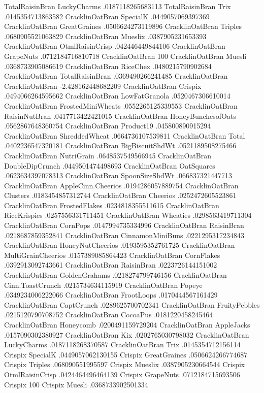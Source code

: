 TotalRaisinBran	LuckyCharms	.0187118265683113
TotalRaisinBran	Trix	.0145354713863582
CracklinOatBran	SpecialK	.0449057069397369
CracklinOatBran	GreatGraines	.0506624273119896
CracklinOatBran	Triples	.0680905521063829
CracklinOatBran	Mueslix	.0387905231653393
CracklinOatBran	OtmlRaisinCrisp	.042446449844106
CracklinOatBran	GrapeNuts	.0712184716810718
CracklinOatBran	100%
CracklinOatBran	Muesli	.0368733905086619
CracklinOatBran	RiceChex	.0480215790902684
CracklinOatBran	TotalRaisinBran	.0369490266241485
CracklinOatBran	CracklinOatBran	-2.428162448682209
CracklinOatBran	Crispix	.0494066264595662
CracklinOatBran	LowFatGranola	.0520467306610014
CracklinOatBran	FrostedMiniWheats	.0552265125339553
CracklinOatBran	RaisinNutBran	.0417713422421015
CracklinOatBran	HoneyBunchesofOats	.0562867648360754
CracklinOatBran	Product19	.045800890915294
CracklinOatBran	ShreddedWheat	.0664736107539811
CracklinOatBran	Total	.0402236547320181
CracklinOatBran	BigBiscuitShdWt	.0521189508275466
CracklinOatBran	NutriGrain	.0648537549566945
CracklinOatBran	DoubleDipCrunch	.0449501474498693
CracklinOatBran	OatSquares	.0623634397078313
CracklinOatBran	SpoonSizeShdWt	.066837321447713
CracklinOatBran	AppleCinn.Cheerios	.0194286057889754
CracklinOatBran	Clusters	.0183454857312744
CracklinOatBran	Cheerios	.0252472605523861
CracklinOatBran	FrostedFlakes	.0234818355511615
CracklinOatBran	RiceKrispies	.0257556331711451
CracklinOatBran	Wheaties	.0298563419711304
CracklinOatBran	CornPops	.0147994735334996
CracklinOatBran	RaisinBran	.0218687859352841
CracklinOatBran	CinnamonMiniBuns	.0221295317234843
CracklinOatBran	HoneyNutCheerios	.0193595352761725
CracklinOatBran	MultiGrainCheerios	.0157389085864423
CracklinOatBran	CornFlakes	.0392913092743661
CracklinOatBran	RaisinBran	.0223726144151002
CracklinOatBran	GoldenGrahams	.0218274799746156
CracklinOatBran	Cinn.ToastCrunch	.0215734634115919
CracklinOatBran	Popeye	.0349234006222066
CracklinOatBran	FrootLoops	.0170444567161429
CracklinOatBran	CaptCrunch	.0289625700702341
CracklinOatBran	FruityPebbles	.0215120790708752
CracklinOatBran	CocoaPus	.0181220458245464
CracklinOatBran	Honeycomb	.0200491159729204
CracklinOatBran	AppleJacks	.0157090302380927
CracklinOatBran	Kix	.0202765030798032
CracklinOatBran	LuckyCharms	.0187118268370587
CracklinOatBran	Trix	.0145354712156114
Crispix	SpecialK	.0449057062130155
Crispix	GreatGraines	.0506624266774687
Crispix	Triples	.068090551995597
Crispix	Mueslix	.0387905230664544
Crispix	OtmlRaisinCrisp	.0424464496464139
Crispix	GrapeNuts	.0712184715693506
Crispix	100%
Crispix	Muesli	.0368733902501334
